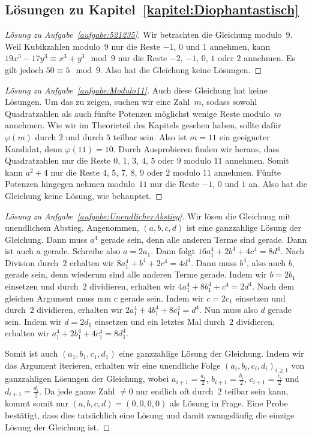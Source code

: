 \subsection*{Lösungen zu Kapitel~\ref{kapitel:Diophantastisch}}


\begin{proof}[Lösung zu Aufgabe~\ref{aufgabe:521235}]
	Wir betrachten die Gleichung modulo~$9$. Weil Kubikzahlen modulo~$9$ nur die Reste $-1$, $0$ und $1$ annehmen, kann $19x^3-17y^3\equiv x^3+y^3\mod 9$ nur die Reste $-2$, $-1$, $0$, $1$ oder $2$ annehmen. Es gilt jedoch $50\equiv 5\mod 9$. Also hat die Gleichung keine Lösungen.
\end{proof}

\begin{proof}[Lösung zu Aufgabe~\ref{aufgabe:Modulo11}]
	Auch diese Gleichung hat keine Lösungen. Um das zu zeigen, suchen wir eine Zahl~$m$, sodass sowohl Quadratzahlen als auch fünfte Potenzen möglichst wenige Reste modulo~$m$ annehmen. Wie wir im Theorieteil des Kapitels gesehen haben, sollte dafür $\varphi(m)$ durch $2$ und durch $5$ teilbar sein. Also ist $m=11$ ein geeigneter Kandidat, denn $\varphi(11)=10$. Durch Ausprobieren finden wir heraus, dass Quadratzahlen nur die Reste $0$, $1$, $3$, $4$, $5$ oder $9$ modulo $11$ annehmen. Somit kann $a^2+4$ nur die Reste $4$, $5$, $7$, $8$, $9$ oder $2$ modulo $11$ annehmen. Fünfte Potenzen hingegen nehmen modulo~$11$ nur die Reste $-1$, $0$ und $1$ an. Also hat die Gleichung keine Lösung, wie behauptet.
\end{proof}

\begin{proof}[Lösung zu Aufgabe~\ref{aufgabe:UnendlicherAbstieg}]
	Wir lösen die Gleichung mit unendlichem Abstieg. Angenommen, $(a,b,c,d)$ ist eine ganzzahlige Lösung der Gleichung. Dann muss $a^4$ gerade sein, denn alle anderen Terme sind gerade. Dann ist auch $a$ gerade. Schreibe also $a=2a_1$. Dann folgt $16a_1^4+2b^4+4c^4=8d^4$. Nach Division durch~$2$ erhalten wir $8a_1^4+b^4+2c^4=4d^4$. Dann muss $b^4$, also auch $b$, gerade sein, denn wiederum sind alle anderen Terme gerade. Indem wir $b=2b_1$ einsetzen und durch~$2$ dividieren, erhalten wir $4a_1^4+8b_1^4+c^4=2d^4$. Nach dem gleichen Argument muss nun $c$ gerade sein. Indem wir $c=2c_1$ einsetzen und durch~$2$ dividieren, erhalten wir $2a_1^4+4b_1^4+8c_1^4=d^4$. Nun muss also $d$ gerade sein. Indem wir $d=2d_1$ einsetzen und ein letztes Mal durch~$2$ dividieren, erhalten wir $a_1^4+2b_1^4+4c_1^4=8d_1^4$.
	
	Somit ist auch $(a_1,b_1,c_1,d_1)$ eine ganzzahlige Lösung der Gleichung. Indem wir das Argument iterieren, erhalten wir eine unendliche Folge $(a_i,b_i,c_i,d_i)_{i\geqslant 1}$ von ganzzahligen Lösungen der Gleichung, wobei $a_{i+1}=\frac{a_i}{2}$, $b_{i+1}=\frac{b_i}{2}$, $c_{i+1}=\frac{c_i}{2}$ und $d_{i+1}=\frac{d_i}{2}$. Da jede ganze Zahl $\neq 0$ nur endlich oft durch~$2$ teilbar sein kann, kommt somit nur $(a,b,c,d)=(0,0,0,0)$ als Lösung in Frage. Eine Probe bestätigt, dass dies tatsächlich eine Lösung und damit zwangsläufig die einzige Lösung der Gleichung ist.
\end{proof}

